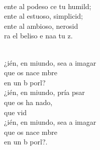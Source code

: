 \begin{cancion}
\begin{chorus}
	\end{chorus}%
	\jump\\
	ente al podeso ce tu humild;\\
	ente al estuoso,  simplicid;\\
	ente al ambioso, nerosid\\
	ra el beliso e naa tu z.\\\jump\\
	\begin{chorus}%
	¿ién, en miundo, sea a imagar \\
	que os nace mbre\\
	en un b porl?  \\
	¿ién, en miundo, pría psar \\
	que os ha nado,\\
	que  vid \\
	¿ién, en miundo, sea a imagar \\
	que os nace mbre\\
	en un b porl?. \\
	\end{chorus}%
	\jump\\
\end{cancion}%
